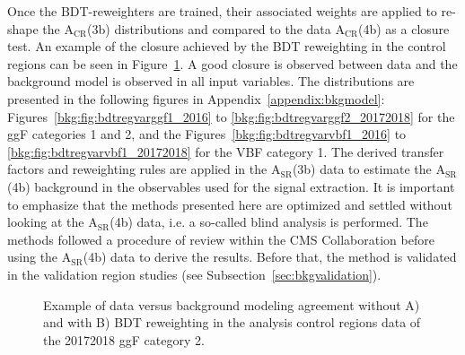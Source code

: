 Once the BDT-reweighters are trained, their associated weights are applied to re-shape the $\mathrm{A_{CR}}$(3b) distributions and compared to the data $\mathrm{A_{CR}}$(4b) as a closure test. An example of the closure achieved by the BDT reweighting in the control regions can be seen in Figure~\ref{fig:bdtreweightingexampleanalysiscr}. A good closure is observed between data and the background model is observed in all input variables. The distributions are presented in the following figures in Appendix~\ref{appendix:bkgmodel}: Figures~\ref{bkg:fig:bdtregvarggf1_2016} to \ref{bkg:fig:bdtregvarggf2_20172018} for the ggF categories 1 and 2, and the Figures~\ref{bkg:fig:bdtregvarvbf1_2016} to \ref{bkg:fig:bdtregvarvbf1_20172018} for the VBF category 1. 
\clearpage
The derived transfer factors and reweighting rules are applied in the $\mathrm{A_{SR}}$(3b) data to estimate the $\mathrm{A_{SR}}$(4b) background in the observables used for the signal extraction. It is important to emphasize that the methods presented here are optimized and settled without looking at the $\mathrm{A_{SR}}$(4b) data, i.e. a so-called blind analysis is performed. The methods followed a procedure of review within the CMS Collaboration before using the $\mathrm{A_{SR}}$(4b) data to derive the results. Before that, the method is validated in the validation region studies (see Subsection~\ref{sec:bkgvalidation}).

\begin{figure}[htbp!]
\begin{center}
\captionsetup[subfigure]{justification=centering}
\end{center}
\caption[Example of the data versus background modeling agreement in 20172018 ggF category 2]{Example of data versus background modeling agreement without A) and with B) BDT reweighting in the analysis control regions data of the 20172018 ggF category 2.}
\label{fig:bdtreweightingexampleanalysiscr}
\end{figure}

